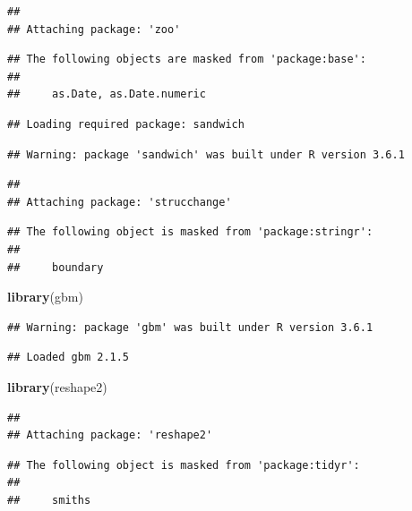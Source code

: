 \documentclass[]{article}
\newenvironment{Shaded}{\begin{snugshade}}{\end{snugshade}}
\newcommand{\KeywordTok}[1]{\textcolor[rgb]{0.13,0.29,0.53}{\textbf{#1}}}
\newcommand{\NormalTok}[1]{#1}
\begin{document}
\begin{verbatim}
## 
## Attaching package: 'zoo'
\end{verbatim}

\begin{verbatim}
## The following objects are masked from 'package:base':
## 
##     as.Date, as.Date.numeric
\end{verbatim}

\begin{verbatim}
## Loading required package: sandwich
\end{verbatim}

\begin{verbatim}
## Warning: package 'sandwich' was built under R version 3.6.1
\end{verbatim}

\begin{verbatim}
## 
## Attaching package: 'strucchange'
\end{verbatim}

\begin{verbatim}
## The following object is masked from 'package:stringr':
## 
##     boundary
\end{verbatim}

\begin{Shaded}
\begin{Highlighting}[]
\KeywordTok{library}\NormalTok{(gbm)}
\end{Highlighting}
\end{Shaded}

\begin{verbatim}
## Warning: package 'gbm' was built under R version 3.6.1
\end{verbatim}

\begin{verbatim}
## Loaded gbm 2.1.5
\end{verbatim}

\begin{Shaded}
\begin{Highlighting}[]
\KeywordTok{library}\NormalTok{(reshape2)}
\end{Highlighting}
\end{Shaded}

\begin{verbatim}
## 
## Attaching package: 'reshape2'
\end{verbatim}

\begin{verbatim}
## The following object is masked from 'package:tidyr':
## 
##     smiths
\end{verbatim}
\end{document}
